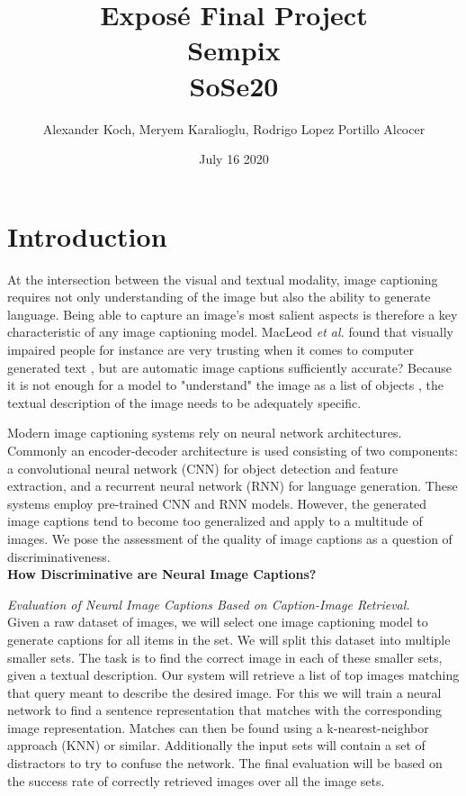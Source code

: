 \documentclass[12pt]{article}
\title{Exposé Final Project \\ \small{Sempix} \\ \small{SoSe20}}
\author{Alexander Koch, Meryem Karalioglu, Rodrigo Lopez Portillo Alcocer}
\date{July 16 2020}
\begin{document}
\maketitle	



\section{Introduction}

At the intersection between the visual and textual modality, image captioning requires not only understanding of the image but also the ability to generate language. Being able to capture an image's most salient aspects is therefore a key characteristic of any image captioning model.
MacLeod \textit{et al.} found that visually impaired people for instance are very trusting when it comes to computer generated text \cite{blind}, but are automatic image captions sufficiently accurate? Because it is not enough for a model to "understand" the image as a list of objects \cite{bernardi2016automatic}, the textual description of the image needs to be adequately specific.

Modern image captioning systems rely on neural network architectures. 
Commonly an encoder-decoder architecture is used consisting of two components: a convolutional neural network (CNN) for object detection and feature extraction, and a recurrent neural network (RNN) for language generation. These systems employ pre-trained CNN and RNN models. 
However, the generated image captions tend to become too generalized and apply to a multitude of images.
We pose the assessment of the quality of image captions as a question of discriminativeness.\\



\textbf{How Discriminative are Neural Image Captions?}

\textit{Evaluation of Neural Image Captions Based on Caption-Image Retrieval.}\\


Given a raw dataset of images, we will select one image captioning model to generate captions for all items in the set. We will split this dataset into multiple smaller sets. The task is to find the correct image in each of these smaller sets, given a textual description. 
Our system will retrieve a list of top images matching that query meant to describe the desired image. For this we will train a neural network to find a sentence representation that matches with the corresponding image representation. 
Matches can then be found using a k-nearest-neighbor approach (KNN) or similar. Additionally the input sets will contain a set of distractors to try to confuse the network. 
The final evaluation will be based on the success rate of correctly retrieved images over all the image sets.
\end{document}
